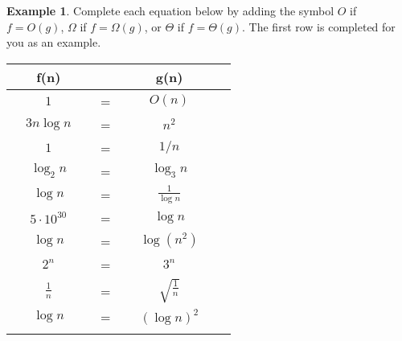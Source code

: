 \documentclass[10pt]{article}
\theoremstyle{definition}
\newtheorem{example}{Example}
\begin{document}
\begin{center}
\end{center}

\newpage
\begin{example}
    Complete each equation below by adding the symbol $O$ if $f=O(g)$, $\Omega$ if $f=\Omega(g)$, or $\Theta$ if $f=\Theta(g)$.  
    The first row is completed for you as an example.

{\renewcommand{\arraystretch}{4.4}
\begin{tabular}{c c c c c c}
    & f(n) &~\hspace{0.5in}~$ $~\hspace{0.5in}~& g(n) &\\
    \hline
    & $1$ & ~\hspace{0.5in}~$=$~\hspace{0.5in}~  & $O(n)$ &  &\\
    \arrayrulecolor{gray}\hline
    & $3 n\log n$ & ~\hspace{0.5in}~$=$~\hspace{0.5in}~  & $n^2$ &  &\\
    \arrayrulecolor{gray}\hline
    & $1$ & ~\hspace{0.5in}~$=$~\hspace{0.5in}~  & $1/n$ &  &\\
    \arrayrulecolor{gray}\hline
    & $\log_2 n$ & ~\hspace{0.5in}~$=$~\hspace{0.5in}~  & $\log_3 n$ &  &\\
    \arrayrulecolor{gray}\hline
    & $\log n$ & ~\hspace{0.5in}~$=$~\hspace{0.5in}~  & $\frac {1} {\log n}$ &  &\\
    \arrayrulecolor{gray}\hline
    & $5\cdot10^{30}$ & ~\hspace{0.5in}~$=$~\hspace{0.5in}~  & $\log n$ &  &\\
    \arrayrulecolor{gray}\hline
    & $\log n$ & ~\hspace{0.5in}~$=$~\hspace{0.5in}~  & $\log (n^2)$ &  &\\
    \arrayrulecolor{gray}\hline
    & $2^n$ & ~\hspace{0.5in}~$=$~\hspace{0.5in}~  & $3^n$ &  &\\
    \arrayrulecolor{gray}\hline
    & $\frac 1 n$ & ~\hspace{0.5in}~$=$~\hspace{0.5in}~  & $\sqrt{\frac 1 n}$ &  &\\
    \arrayrulecolor{gray}\hline
    & $\log n$ & ~\hspace{0.5in}~$=$~\hspace{0.5in}~  & $(\log n)^2$ &  &\\
    \arrayrulecolor{gray}\hline


\end{tabular}}
\end{example}
\end{document}
